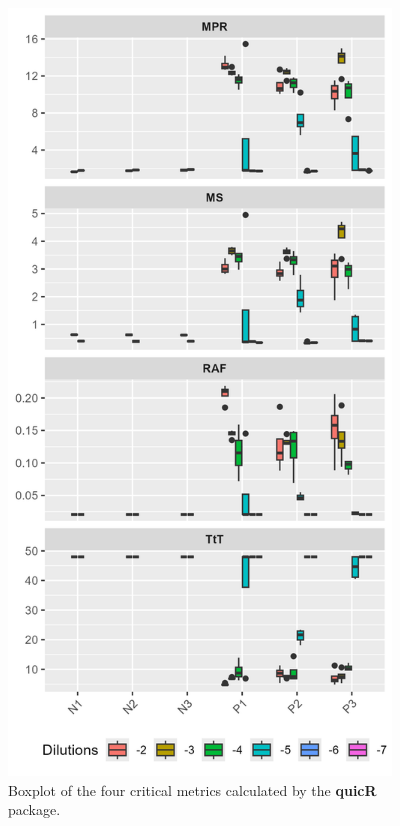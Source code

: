 \documentclass[preprint,12pt,a4paper]{elsarticle}
\begin{document}
            \begin{figure}[ht]
                \centering
                \includegraphics[height=8in]{images/boxplot.png}
                \caption{Boxplot of the four critical metrics calculated by the \textbf{quicR} package.}
                \label{fig:boxplot}
            \end{figure}
\end{document}
